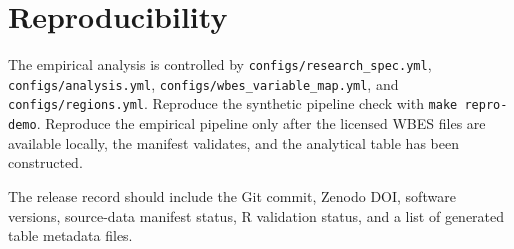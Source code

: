 \section{Reproducibility}

The empirical analysis is controlled by \texttt{configs/research\_spec.yml},
\texttt{configs/analysis.yml}, \texttt{configs/wbes\_variable\_map.yml}, and
\texttt{configs/regions.yml}. Reproduce the synthetic pipeline check with
\texttt{make repro-demo}. Reproduce the empirical pipeline only after the
licensed WBES files are available locally, the manifest validates, and the
analytical table has been constructed.

The release record should include the Git commit, Zenodo DOI, software versions,
source-data manifest status, R validation status, and a list of generated table
metadata files.
